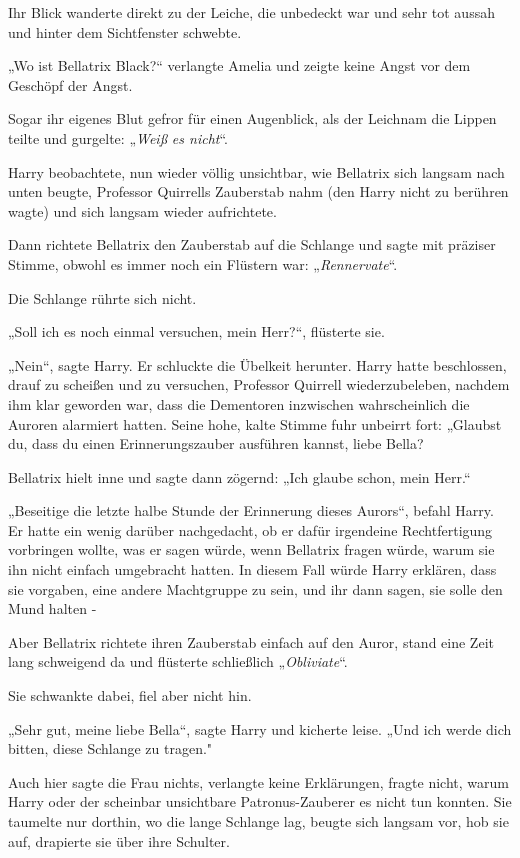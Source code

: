 {Ihr Blick wanderte direkt zu der Leiche, die unbedeckt war und sehr tot aussah und hinter dem Sichtfenster schwebte.

„Wo ist Bellatrix Black?“ verlangte Amelia und zeigte keine Angst vor dem Geschöpf der Angst.

Sogar ihr eigenes Blut gefror für einen Augenblick, als der Leichnam die Lippen teilte und gurgelte: „\emph{Weiß} \emph{es nicht}“.

Harry beobachtete, nun wieder völlig unsichtbar, wie Bellatrix sich langsam nach unten beugte, Professor Quirrells Zauberstab nahm (den Harry nicht zu berühren wagte) und sich langsam wieder aufrichtete.

Dann richtete Bellatrix den Zauberstab auf die Schlange und sagte mit präziser Stimme, obwohl es immer noch ein Flüstern war: „\emph{Rennervate}“.

Die Schlange rührte sich nicht.

„Soll ich es noch einmal versuchen, mein Herr?“, flüsterte sie.

„Nein“, sagte Harry. Er schluckte die Übelkeit herunter. Harry hatte beschlossen, drauf zu scheißen und zu versuchen, Professor Quirrell wiederzubeleben, nachdem ihm klar geworden war, dass die Dementoren inzwischen wahrscheinlich die Auroren alarmiert hatten. Seine hohe, kalte Stimme fuhr unbeirrt fort: „Glaubst du, dass du einen Erinnerungszauber ausführen kannst, liebe Bella?

Bellatrix hielt inne und sagte dann zögernd: „Ich glaube schon, mein Herr.“

„Beseitige die letzte halbe Stunde der Erinnerung dieses Aurors“, befahl Harry. Er hatte ein wenig darüber nachgedacht, ob er dafür irgendeine Rechtfertigung vorbringen wollte, was er sagen würde, wenn Bellatrix fragen würde, warum sie ihn nicht einfach umgebracht hatten. In diesem Fall würde Harry erklären, dass sie vorgaben, eine andere Machtgruppe zu sein, und ihr dann sagen, sie solle den Mund halten -

Aber Bellatrix richtete ihren Zauberstab einfach auf den Auror, stand eine Zeit lang schweigend da und flüsterte schließlich „\emph{Obliviate}“.

Sie schwankte dabei, fiel aber nicht hin.

„Sehr gut, meine liebe Bella“, sagte Harry und kicherte leise. „Und ich werde dich bitten, diese Schlange zu tragen."

Auch hier sagte die Frau nichts, verlangte keine Erklärungen, fragte nicht, warum Harry oder der scheinbar unsichtbare Patronus-Zauberer es nicht tun konnten. Sie taumelte nur dorthin, wo die lange Schlange lag, beugte sich langsam vor, hob sie auf, drapierte sie über ihre Schulter.

}
